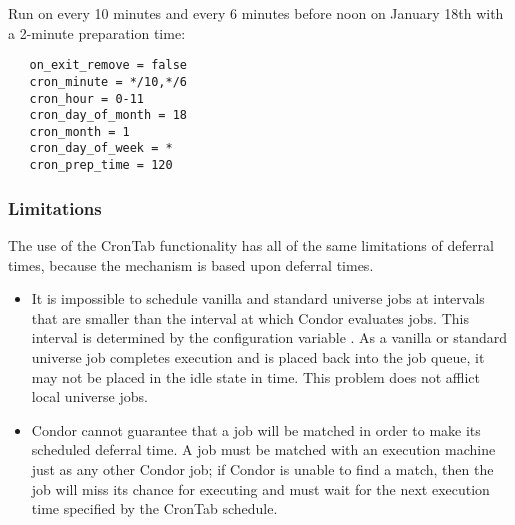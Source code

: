 Run on every 10 minutes and every 6 minutes before noon 
on January 18th with a 2-minute preparation time:

\begin{verbatim}
   on_exit_remove = false
   cron_minute = */10,*/6
   cron_hour = 0-11
   cron_day_of_month = 18
   cron_month = 1
   cron_day_of_week = *
   cron_prep_time = 120
\end{verbatim}

\subsubsection{Limitations}
\label{sec:Crontab-Limitations}
The use of the CronTab functionality has all of the same 
limitations of deferral times,
because the mechanism is based upon deferral times.

\begin{itemize}
\item It is impossible to schedule vanilla 
and standard universe jobs 
at intervals that are smaller than the
interval at which Condor evaluates jobs.
This interval is determined by 
the configuration variable . 
As a vanilla or standard universe job completes execution 
and is placed back into the job queue, 
it may not be placed in the idle state in time.
This problem does not afflict local universe jobs.

\item Condor cannot guarantee that a job will be
matched in order to make its scheduled deferral time.
A job must be matched with an execution machine just as
any other Condor job; 
if Condor is unable to find a match, 
then the job will miss its chance for executing
and must wait for the next execution time 
specified by the CronTab schedule.

\end{itemize}
